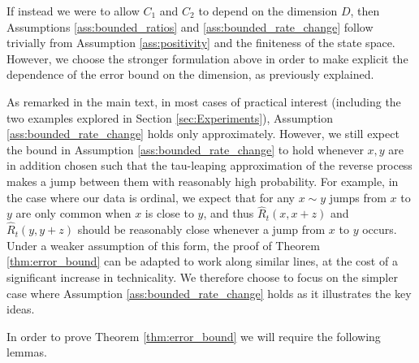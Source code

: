 \documentclass{article}
\begin{document}
If instead we were to allow $C_1$ and $C_2$ to depend on the dimension $D$, then Assumptions \ref{ass:bounded_ratios} and \ref{ass:bounded_rate_change} follow trivially from Assumption \ref{ass:positivity} and the finiteness of the state space. However, we choose the stronger formulation above in order to make explicit the dependence of the error bound on the dimension, as previously explained.

As remarked in the main text, in most cases of practical interest (including the two examples explored in Section \ref{sec:Experiments}), Assumption \ref{ass:bounded_rate_change} holds only approximately. However, we still expect the bound in Assumption \ref{ass:bounded_rate_change} to hold whenever $x,y$ are in addition chosen such that the tau-leaping approximation of the reverse process makes a jump between them with reasonably high probability. For example, in the case where our data is ordinal, we expect that for any $x \sim y$ jumps from $x$ to $y$ are only common when $x$ is close to $y$, and thus $\hat R_t(x, x+z)$ and $\hat R_t(y, y+z)$ should be reasonably close whenever a jump from $x$ to $y$ occurs. Under a weaker assumption of this form, the proof of Theorem \ref{thm:error_bound} can be adapted to work along similar lines, at the cost of a significant increase in technicality. We therefore choose to focus on the simpler case where Assumption \ref{ass:bounded_rate_change} holds as it illustrates the key ideas.

In order to prove Theorem \ref{thm:error_bound} we will require the following lemmas.
\end{document}
